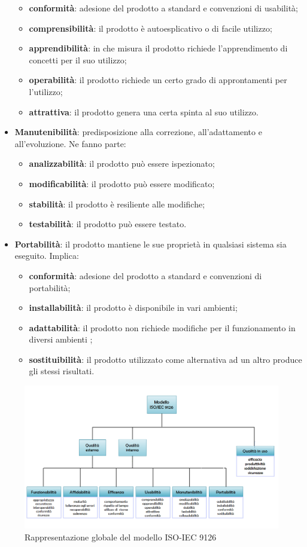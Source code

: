 \begin{itemize}
	\begin{itemize}
		\item \textbf{conformità}: adesione del prodotto a standard e convenzioni di usabilità;
		\item \textbf{comprensibilità}: il prodotto è autoesplicativo o di facile utilizzo;
		\item \textbf{apprendibilità}: in che misura il prodotto richiede l'apprendimento di concetti per il suo utilizzo;
		\item \textbf{operabilità}: il prodotto richiede un certo grado di approntamenti per l'utilizzo;
		\item \textbf{attrattiva}: il prodotto genera una certa spinta al suo utilizzo.
	\end{itemize}	
	\item \textbf{Manutenibilità}: predisposizione alla correzione, all'adattamento e all'evoluzione. Ne fanno parte: 
	\begin{itemize}
		\item \textbf{analizzabilità}: il prodotto può essere ispezionato;
		\item \textbf{modificabilità}: il prodotto può essere modificato;
		\item \textbf{stabilità}: il prodotto è resiliente alle modifiche;
		\item \textbf{testabilità}: il prodotto può essere testato.
	\end{itemize}
	\item \textbf{Portabilità}: il prodotto mantiene le sue proprietà in qualsiasi sistema sia eseguito. Implica:
	\begin{itemize}
		\item \textbf{conformità}: adesione del prodotto a standard e convenzioni di portabilità;
	\item \textbf{installabilità}: il prodotto è disponibile in vari ambienti;
	\item \textbf{adattabilità}: il prodotto non richiede modifiche per il funzionamento in diversi ambienti ;
	\item \textbf{sostituibilità}: il prodotto utilizzato come alternativa ad un altro produce gli stessi risultati.
	\end{itemize}
\end{itemize}
\begin{figure}[H]
	\centering
	\includegraphics[width=15cm]{iso9126}
	\caption{Rappresentazione globale del modello ISO-IEC 9126}
\end{figure}